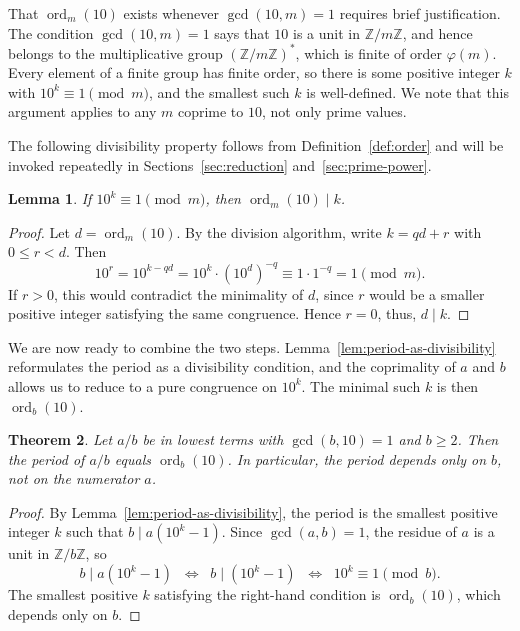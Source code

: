 \documentclass[12pt]{amsart}
\newtheorem{theorem}{Theorem}[section]
\newtheorem{lemma}[theorem]{Lemma}
\theoremstyle{definition}
\theoremstyle{remark}
\newcommand{\Z}{\mathbb{Z}}
\newcommand{\ord}{\operatorname{ord}}
\begin{document}
That $\ord_m(10)$ exists whenever $\gcd(10, m) = 1$ requires brief 
justification. The condition $\gcd(10, m) = 1$ says that $10$ is a unit 
in $\Z/m\Z$, and hence belongs to the multiplicative group 
$(\Z/m\Z)^*$, which is finite of order $\varphi(m)$. Every element of a 
finite group has finite order, so there is some positive integer $k$ 
with $10^k \equiv 1 \pmod{m}$, and the smallest such $k$ is well-defined. 
We note that this argument applies to any $m$ coprime to $10$, not only 
prime values.

The following divisibility property follows from Definition~\ref{def:order} and 
will be invoked repeatedly in Sections~\ref{sec:reduction} 
and~\ref{sec:prime-power}.

\begin{lemma}\label{lem:order-divides}
If $10^k \equiv 1 \pmod{m}$, then $\ord_m(10) \mid k$.
\end{lemma}

\begin{proof}
Let $d = \ord_m(10)$. By the division algorithm, write $k = qd + r$ with 
$0 \le r < d$. Then
\[
  10^r = 10^{k - qd} = 10^k \cdot (10^d)^{-q} \equiv 1 \cdot 1^{-q} = 1 
  \pmod{m}.
\]
If $r > 0$, this would contradict the minimality of $d$, since $r$ 
would be a smaller positive integer satisfying the same congruence. 
Hence $r = 0$, thus, $d \mid k$.
\end{proof}

We are now ready to combine the two steps. 
Lemma~\ref{lem:period-as-divisibility} reformulates the period as a 
divisibility condition, and the coprimality of $a$ and $b$ allows us to reduce to a pure congruence on $10^k$. The minimal such $k$ is 
then $\ord_b(10)$.

\begin{theorem}\label{thm:period-equals-order}
Let $a/b$ be in lowest terms with $\gcd(b, 10) = 1$ and $b \ge 2$. 
Then the period of $a/b$ equals $\ord_b(10)$. In particular, the period 
depends only on $b$, not on the numerator $a$.
\end{theorem}

\begin{proof}
By Lemma~\ref{lem:period-as-divisibility}, the period is the smallest 
positive integer $k$ such that $b \mid a(10^k - 1)$. Since 
$\gcd(a, b) = 1$, the residue of $a$ is a unit in $\Z/b\Z$, so
\[
  b \mid a(10^k - 1) 
  \;\;\Longleftrightarrow\;\; b \mid (10^k - 1) 
  \;\;\Longleftrightarrow\;\; 10^k \equiv 1 \pmod{b}.
\]
The smallest positive $k$ satisfying the right-hand condition is 
$\ord_b(10)$, which depends only on $b$.
\end{proof}
\end{document}
